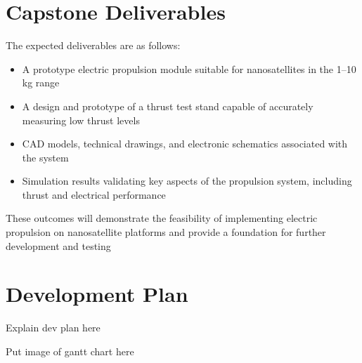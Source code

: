 \section{Capstone Deliverables}

The expected deliverables are as follows:

\begin{itemize}
    \item A prototype electric propulsion module suitable for nanosatellites in the 1–10 kg range
    \item A design and prototype of a thrust test stand capable of accurately measuring low thrust levels
    \item CAD models, technical drawings, and electronic schematics associated with the system
    \item Simulation results validating key aspects of the propulsion system, including thrust and electrical performance
\end{itemize}

These outcomes will demonstrate the feasibility of implementing electric propulsion on nanosatellite platforms and provide a foundation for further development and testing	

\section{Development Plan}

Explain dev plan here

Put image of gantt chart here